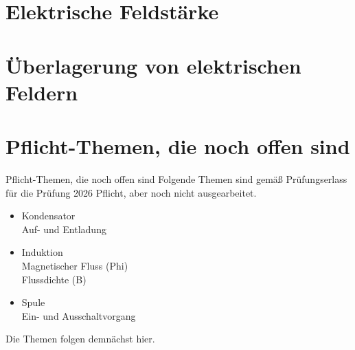 \documentclass[aspectratio=169, ignorenonframetext]{beamer}
\begin{document}
\section[E-Feld]{Elektrische Feldstärke}



\section[Überlagerung E]{Überlagerung von elektrischen Feldern}

\section{Pflicht-Themen, die noch offen sind}
\begin{frame}{Pflicht-Themen, die noch offen sind}
Folgende Themen sind gemäß Prüfungserlass für die Prüfung 2026 Pflicht, aber noch nicht ausgearbeitet.
\begin{itemize}
    \item Kondensator
    \\ Auf- und Entladung
    \item Induktion
    \\ Magnetischer Fluss (Phi)
    \\ Flussdichte (B) 
    \item Spule
    \\ Ein- und Ausschaltvorgang 
\end{itemize}

Die Themen folgen demnächst hier.
\end{frame}
\end{document}

